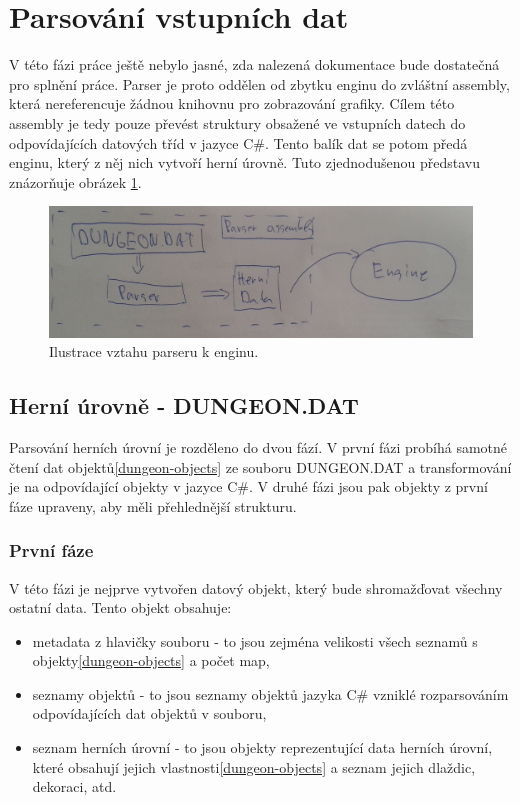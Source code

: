 \section{Parsování vstupních dat}\label{level-parsing}

V této fázi práce ještě nebylo jasné, zda nalezená dokumentace\cite{TechnicalDocumentationFontanel05} bude dostatečná
pro splnění práce. Parser je proto oddělen od zbytku enginu do zvláštní assembly, která nereferencuje žádnou knihovnu
pro zobrazování grafiky. Cílem této assembly je tedy pouze převést struktury obsažené ve vstupních datech do odpovídajících
datových tříd v jazyce C\#. Tento balík dat se potom předá enginu, který z něj nich vytvoří herní úrovně. Tuto zjednodušenou
představu znázorňuje obrázek \ref{parser-preview:analyza}.

\begin{figure}[H]\centering
\includegraphics[width=\textwidth]{./img/DM-parser-preview.png}
\caption{Ilustrace vztahu parseru k enginu.}
\label{parser-preview:analyza}
\end{figure}

\subsection{Herní úrovně - DUNGEON.DAT}\label{dungeon-parser}

Parsování herních úrovní je rozděleno do dvou fází. V první fázi probíhá samotné čtení dat objektů\vref{dungeon-objects} ze souboru DUNGEON.DAT
a transformování je na odpovídající objekty v jazyce C\#. V druhé fázi jsou pak objekty z první fáze upraveny,
aby měli přehlednější strukturu. 


\subsubsection{První fáze}

V této fázi je nejprve vytvořen datový objekt, který bude shromažďovat všechny ostatní data. Tento objekt obsahuje:

\begin{itemize}
\item metadata z hlavičky souboru - to jsou zejména velikosti všech seznamů s objekty\vref{dungeon-objects} a počet map,
\item seznamy objektů - to jsou seznamy objektů jazyka C\# vzniklé rozparsováním odpovídajících dat objektů v souboru,
\item seznam herních úrovní - to jsou objekty reprezentující data herních úrovní, které obsahují jejich vlastnosti\vref{dungeon-objects} a seznam jejich dlaždic, dekoraci, atd. 
\end{itemize}

